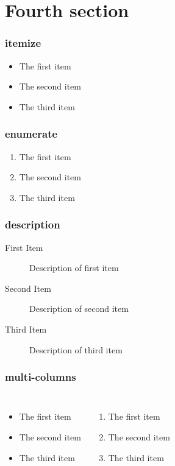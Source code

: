 \documentclass[no-math, xcolor=table]{beamer} %
\begin{document}
\section{Fourth section}
\begin{frame}[t]\frametitle{itemize}
	\begin{itemize}
		\item The first item
		\item The second item
		\item The third item
	\end{itemize}
\end{frame}

\begin{frame}[t]\frametitle{enumerate}
	\begin{enumerate}
		\item The first item
		\item The second item
		\item The third item
	\end{enumerate}
\end{frame}

\begin{frame}[t]\frametitle{description}
	\begin{description}
		\item[First Item] Description of first item
		\item[Second Item] Description of second item
		\item[Third Item] Description of third item
	\end{description}
\end{frame}


\begin{frame}[c]\frametitle{multi-columns}
	\begin{columns}
		\begin{itemize}
			\item The first item
			\item The second item
			\item The third item
		\end{itemize}
		\begin{enumerate}
			\item The first item
			\item The second item
			\item The third item
		\end{enumerate}
	\end{columns}

\end{frame}
\end{document}

